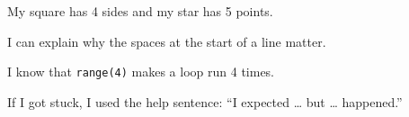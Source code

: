 \begin{selfcheck}
  \item My square has 4 sides and my star has 5 points.
  \item I can explain why the spaces at the start of a line matter.
  \item I know that \texttt{range(4)} makes a loop run 4 times.
  \item If I got stuck, I used the help sentence: \enquote{I expected \ldots{} but \ldots{} happened.}
\end{selfcheck}
